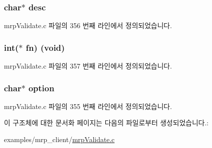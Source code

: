 \subsubsection[{\texorpdfstring{desc}{desc}}]{\setlength{\rightskip}{0pt plus 5cm}char$\ast$ desc}\hypertarget{structmenu__option_a3aad16fd4bea1b9717f232ea75ad6449}{}\label{structmenu__option_a3aad16fd4bea1b9717f232ea75ad6449}


mrp\+Validate.\+c 파일의 356 번째 라인에서 정의되었습니다.

\subsubsection[{\texorpdfstring{fn}{fn}}]{\setlength{\rightskip}{0pt plus 5cm}int($\ast$ fn) (void)}\hypertarget{structmenu__option_a99dd1ee43f3d0c2b26116fc4528bf21d}{}\label{structmenu__option_a99dd1ee43f3d0c2b26116fc4528bf21d}


mrp\+Validate.\+c 파일의 357 번째 라인에서 정의되었습니다.

\subsubsection[{\texorpdfstring{option}{option}}]{\setlength{\rightskip}{0pt plus 5cm}char$\ast$ {\bf option}}\hypertarget{structmenu__option_a756aafa2c9b99eaa7eb7f8886c7a8cb2}{}\label{structmenu__option_a756aafa2c9b99eaa7eb7f8886c7a8cb2}


mrp\+Validate.\+c 파일의 355 번째 라인에서 정의되었습니다.



이 구조체에 대한 문서화 페이지는 다음의 파일로부터 생성되었습니다.\+:\begin{DoxyCompactItemize}
\item 
examples/mrp\+\_\+client/\hyperlink{mrp_validate_8c}{mrp\+Validate.\+c}\end{DoxyCompactItemize}
